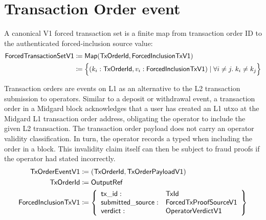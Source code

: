 \documentclass[../midgard.tex]{subfiles}
\begin{document}
\section{Transaction Order event}
\label{h:transaction-order-event}

A canonical V1 forced transaction set is a finite map from transaction order ID
to the authenticated forced-inclusion source value:
\begin{align*}
    \mathsf{ForcedTransactionSetV1} &\coloneq \mathsf{Map(TxOrderId, ForcedInclusionTxV1)} \\
      &\coloneq \Bigl\{
        (k_i: \mathsf{TxOrderId}, v_i: \mathsf{ForcedInclusionTxV1}) \mid \forall i \neq j.\; k_i \neq k_j
    \Bigr\}
\end{align*}

Transaction orders are events on L1 as an alternative to the L2 transaction submission to operators.
Similar to a deposit or withdrawal event, a transaction order in a Midgard block acknowledges that a user has created an L1 utxo at the Midgard L1 transaction order address, obligating the operator to include the given L2 transaction.
The transaction order payload does not carry an operator validity classification.
In turn, the operator records a typed  when including the order in a block.
This invalidity claim itself can then be subject to fraud proofs if the operator had stated incorrectly.
\begingroup
\allowdisplaybreaks{}
\begin{align*}
    \mathsf{TxOrderEventV1} &\coloneq \mathsf{(TxOrderId, TxOrderPayloadV1)} \\
    \mathsf{TxOrderId} &\coloneq \mathsf{OutputRef} \\
    \mathsf{ForcedInclusionTxV1} &\coloneq \left\{
    \begin{array}{ll}
        \mathsf{tx\_id} : & \mathsf{TxId} \\
        \mathsf{submitted\_source} : & \mathsf{ForcedTxProofSourceV1} \\
        \mathsf{verdict} : & \mathsf{OperatorVerdictV1}
    \end{array} \right\}
\end{align*}
\endgroup
\end{document}
